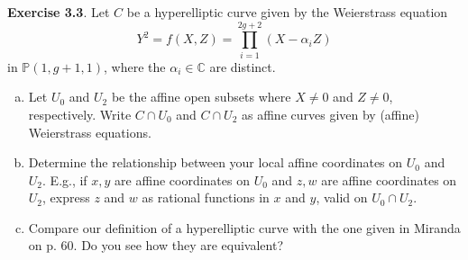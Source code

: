 \documentclass[12pt]{amsart}
\newenvironment{exolab}[1]
{\noindent\textbf{Exercise #1}.}
{\vskip 6pt}
\theoremstyle{remark}
\newcommand{\C}{\mathbb C}
\newcommand{\PP}{\mathbb P}
\begin{document}
\begin{exolab}{3.3}
  Let $C$ be a hyperelliptic curve given by the Weierstrass equation
  \begin{equation*}
    Y^2 = f(X,Z) = \prod_{i=1}^{2g+2} (X - \alpha_i Z)
  \end{equation*}
  in $\PP(1,g+1,1)$, where the $\alpha_i \in \C$ are distinct.
  \begin{enumerate}[(a)]
    \item 
      Let $U_0$ and $U_2$ be the affine open subsets where $X \neq 0$ and $Z \neq 0$, respectively. Write $C \cap U_0$ and $C \cap U_2$ as affine curves given by (affine) Weierstrass equations.
    \item
      Determine the relationship between your local affine coordinates on $U_0$ and $U_2$. E.g., if $x,y$ are affine coordinates on $U_0$ and $z,w$ are affine coordinates on $U_2$, express $z$ and $w$ as rational functions in $x$ and $y$, valid on $U_0 \cap U_2$.
    \item
      Compare our definition of a hyperelliptic curve with the one given in Miranda on p. 60. Do you see how they are equivalent?
  \end{enumerate}
\end{exolab}
\end{document}
